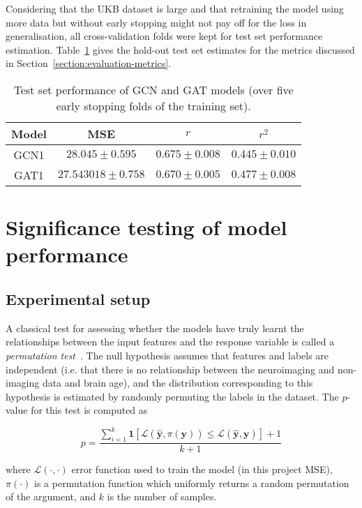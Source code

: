 Considering that the UKB dataset is large and that retraining the model using more data but without early stopping might not pay off for the loss in generalisation, all cross-validation folds were kept for test set performance estimation. Table~\ref{table:test-performance} gives the hold-out test set estimates for the metrics discussed in Section~\ref{section:evaluation-metrics}.

\begin{table}[h]
    \caption{Test set performance of GCN and GAT models (over five early stopping folds of the training set).}\label{table:test-performance}
    \centering
    \small
    \begin{tabular}{cccc}
        \hline
    \textbf{Model} & \textbf{MSE} & $r$ & $r^2$ \\  \hline
        GCN1 & $28.045 \pm 0.595$ & $0.675 \pm 0.008$ & $0.445 \pm 0.010$ \\
        GAT1 & $27.543018 \pm 0.758$ & $0.670 \pm 0.005$ & $0.477 \pm 0.008$ \\ \hline
\end{tabular}
\end{table}


\section{Significance testing of model performance}
\subsection{Experimental setup}
A classical test for assessing whether the models have truly learnt the relationships between the input features and the response variable is called a \textit{permutation test}~\cite{ojala2010permutation}. The null hypothesis assumes that features and labels are independent (i.e. that there is no relationship between the neuroimaging and non-imaging data and brain age), and the distribution corresponding to this hypothesis is estimated by randomly permuting the labels in the dataset. The $p$-value for this test is computed as

\begin{equation}
    p = \frac{\sum_{i=1}^k \mathbf{1}\left[\mathcal{L}(\mathbf{\hat{y}}, \pi(\mathbf{y})) \leq \mathcal{L}(\mathbf{\hat{y}}, \mathbf{y})\right] + 1}{k+1}\label{eq:p-value}
\end{equation}

where $\mathcal{L}(\cdot, \cdot)$ error function used to train the model (in this project MSE), $\pi(\cdot)$ is a permutation function which uniformly returns a random permutation of the argument, and $k$ is the number of samples.

